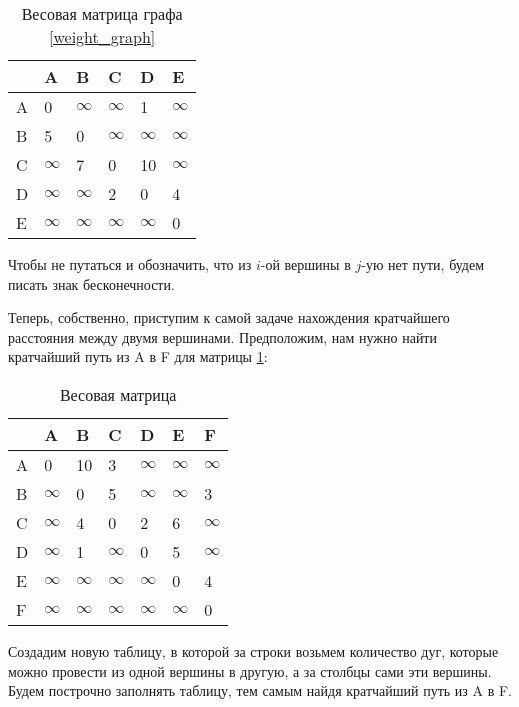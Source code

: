 \begin{table}[h]
    \centering
    \begin{tabular}[c]{ | l | l | l | l | l | l | }
        \hline
          & A & B & C & D & E \\ \hline
        A & 0 & $\infty$ & $\infty$ & 1 & $\infty$ \\ \hline
        B & 5 & 0 & $\infty$ & $\infty$ & $\infty$ \\ \hline
        C & $\infty$ & 7 & 0 & 10 & $\infty$ \\ \hline
        D & $\infty$ & $\infty$ & 2 & 0 & 4 \\ \hline
        E & $\infty$ & $\infty$ & $\infty$ & $\infty$ & 0 \\
        \hline
    \end{tabular}
    \caption{Весовая матрица графа \ref{weight_graph}}
\end{table}
Чтобы не путаться и обозначить, что из $i$-ой вершины в $j$-ую нет пути, будем писать знак 
бесконечности.

Теперь, собственно, приступим к самой задаче нахождения кратчайшего расстояния между двумя вершинами.
Предположим, нам нужно найти кратчайший путь из A в F для матрицы \ref{weight_matrix}:
\begin{table}[h]
    \centering
    \begin{tabular}[c]{ | l | l | l | l | l | l | l | }
        \hline
          & A & B & C & D & E & F \\ \hline
        A & 0 & 10 & 3 & $\infty$ & $\infty$ & $\infty$ \\ \hline
        B & $\infty$ & 0 & 5 & $\infty$ & $\infty$ & 3 \\ \hline
        C & $\infty$ & 4 & 0 & 2 & 6 & $\infty$ \\ \hline
        D & $\infty$ & 1 & $\infty$ & 0 & 5 & $\infty$ \\ \hline
        E & $\infty$ & $\infty$ & $\infty$ & $\infty$ & 0 & 4 \\ \hline
        F & $\infty$ & $\infty$ & $\infty$ & $\infty$ & $\infty$ & 0 \\
        \hline
    \end{tabular}
    \caption{Весовая матрица}
    \label{weight_matrix}
\end{table}

Создадим новую таблицу, в которой за строки возьмем количество дуг, которые
можно провести из одной вершины в другую, а за столбцы сами эти вершины. Будем построчно
заполнять таблицу, тем самым найдя кратчайший путь из A в F.

